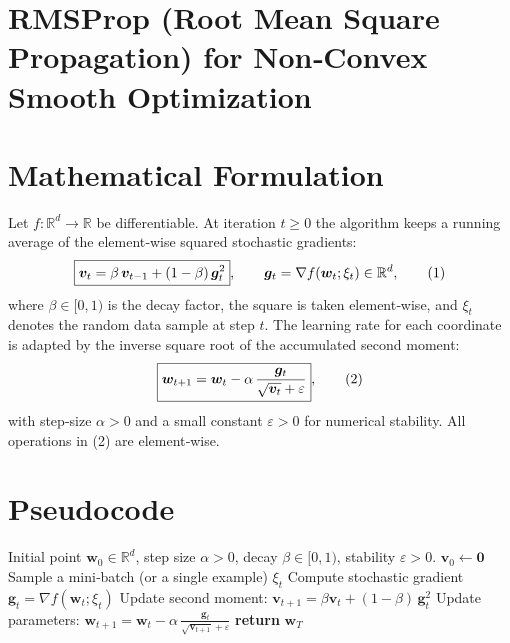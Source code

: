 \documentclass{article}
\newcommand{\R}{\mathbb{R}}
\begin{document}
\section*{RMSProp (Root Mean Square Propagation) for Non‑Convex Smooth Optimization}

\section*{Mathematical Formulation}
Let $f:\R^{d}\rightarrow\R$ be differentiable.  
At iteration $t\ge 0$ the algorithm keeps a running average of the element‑wise
squared stochastic gradients:
\[
\boxed{%
\bm v_{t}= \beta \,\bm v_{t-1}+ (1-\beta)\,\bm g_{t}^{2}},\qquad
\bm g_{t}= \nabla f(\bm w_{t};\xi_{t})\in\R^{d},
\tag{1}
\]
where $\beta\in[0,1)$ is the decay factor, the square is taken element‑wise,
and $\xi_{t}$ denotes the random data sample at step $t$.  
The learning rate for each coordinate is adapted by the inverse square root of
the accumulated second moment:
\[
\boxed{%
\bm w_{t+1}= \bm w_{t}-\alpha\,\frac{\bm g_{t}}{\sqrt{\bm v_{t}}+\varepsilon}},
\tag{2}
\]
with step‑size $\alpha>0$ and a small constant $\varepsilon>0$ for numerical
stability.  All operations in (2) are element‑wise.

\section*{Pseudocode}
\begin{algorithm}[H]
\caption{RMSProp for Stochastic Non‑Convex Optimization}
\begin{algorithmic}[1]
\Require Initial point $\bm w_{0}\in\R^{d}$, step size $\alpha>0$, decay $\beta\in[0,1)$, stability $\varepsilon>0$.
\State $\bm v_{0}\gets \bm 0$
    \State Sample a mini‑batch (or a single example) $\xi_{t}$
    \State Compute stochastic gradient $\bm g_{t}= \nabla f(\bm w_{t};\xi_{t})$
    \State Update second moment:
          $\displaystyle \bm v_{t+1}= \beta \bm v_{t}+ (1-\beta)\,\bm g_{t}^{2}$ 
    \State Update parameters:
          $\displaystyle \bm w_{t+1}= \bm w_{t}-\alpha\,
          \frac{\bm g_{t}}{\sqrt{\bm v_{t+1}}+\varepsilon}$ 
\EndFor
\State \textbf{return} $\bm w_{T}$
\end{algorithmic}
\end{algorithm}
\end{document}
